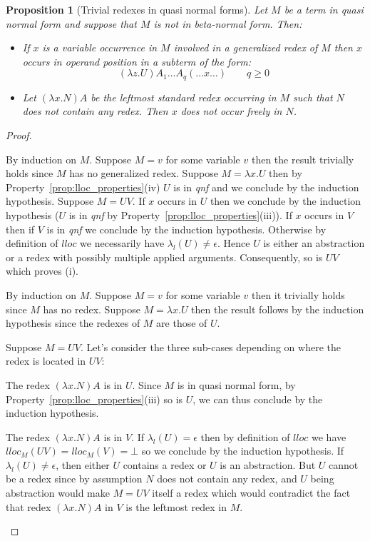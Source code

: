 \documentclass{article}
\theoremstyle{plain}
\newtheorem{proposition}[theorem]{Proposition}
\theoremstyle{definition}
\theoremstyle{remark}
\begin{document}
\begin{proposition}[Trivial redexes in quasi normal forms]
\label{prop:qnf_nf}
Let $M$ be a term in quasi normal form and suppose that $M$ is not in beta-normal form. Then:
\begin{itemize}
\item[(i)] If $x$ is a variable occurrence in $M$ involved in a generalized redex of $M$ then $x$ occurs in operand position in a subterm of the form:
$$(\lambda z .U) A_1 \ldots A_q (\ldots x \ldots) \qquad q\geq 0$$
\item[(ii)] Let $(\lambda x . N) A$ be the leftmost standard redex occurring in $M$ such that $N$ does not contain any redex. Then $x$ does not occur freely in $N$.
\end{itemize}
\end{proposition}
\begin{proof}
\begin{compactitem}
\item[(i)] By induction on $M$. Suppose $M = v$ for some variable $v$ then the result trivially holds since $M$ has no generalized redex. Suppose $M = \lambda x . U$ then by Property~\ref{prop:lloc_properties}(iv) $U$ is in \emph{qnf} and we conclude by the induction hypothesis.
    Suppose $M = U V$. If $x$ occurs in $U$ then we conclude by the induction hypothesis ($U$ is in \emph{qnf} by Property~\ref{prop:lloc_properties}(iii)). If $x$ occurs in $V$ then if $V$ is in \emph{qnf} we conclude by the induction hypothesis. Otherwise by definition of $lloc$ we necessarily have $\lambda_l(U) \neq \epsilon$. Hence $U$ is either an abstraction or a redex with possibly multiple applied arguments. Consequently, so is $UV$ which proves (i).

\item[(ii)] By induction on $M$. Suppose $M = v$ for some variable $v$ then it trivially holds since $M$ has no redex. Suppose $M = \lambda x . U$ then the result follows by the induction hypothesis since the redexes of $M$ are those of $U$.

Suppose $M = U V$. Let's consider the three sub-cases depending on where the redex is located in $U V$:
\begin{compactitem}
  \item[(1)] The redex $(\lambda x . N) A$  is in $U$. Since $M$ is in quasi normal form, by Property~\ref{prop:lloc_properties}(iii) so is $U$, we can thus conclude by the induction hypothesis.

  \item[(2)] The redex $(\lambda x . N) A$  is in $V$.
If $\lambda_l(U) = \epsilon$ then by definition of $lloc$ we have $lloc_M(UV) = lloc_M(V) = \bot$ so we conclude by the induction hypothesis.
If $\lambda_l(U) \neq \epsilon$, then either $U$ contains a redex or $U$ is an abstraction. But $U$ cannot be a redex since by assumption $N$ does not contain any redex, and $U$ being abstraction would make $M = U V$ itself a redex which would contradict the fact that redex $(\lambda x . N) A$ in $V$ is the leftmost redex in $M$.


\end{compactitem}
\end{compactitem}
\end{proof}
\end{document}
